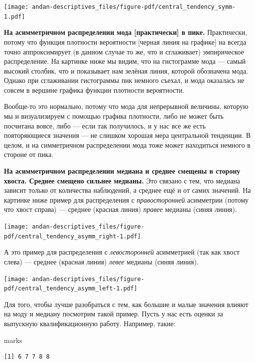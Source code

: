 \documentclass[
  letterpaper,
  DIV=11,
  numbers=noendperiod]{scrreprt}
\newenvironment{Shaded}{}{}
\newcommand{\NormalTok}[1]{\textcolor[rgb]{0.14,0.16,0.18}{#1}}
\theoremstyle{definition}
\theoremstyle{remark}
\begin{document}
\texttt{[image: andan-descriptives\_files/figure-pdf/central\_tendency\_symm-1.pdf]}

\textbf{На асимметричном распределении мода {[}практически{]} в пике.}
Практически, потому что функция плотности вероятности {[}черная линия на
графике{]} на всегда точно аппроксимирует (в данном случае то же, что и
сглаживает) эмпирическое распределение. На картинке ниже мы видим, что
на гистограмме мода --- самый высокий столбик, что и показывает нам
зелёная линия, которой обозначена мода. Однако при сглаживании
гистограммы пик немного съехал, и мода оказалась не совсем в вершине
графика функции плотности вероятности.

Вообще-то это нормально, потому что мода для непрерывной величины,
которую мы и визуализируем с помощью графика плотности, либо не может
быть посчитана вовсе, либо --- если так получилось, и у нас все же есть
повторяющиеся значения --- не слишком хорошая мера центральной
тенденции. В целом, и на симметричном распределении мода тоже может
находиться немного в стороне от пика.

\textbf{На асимметричном распределении медиана и среднее смещены в
сторону хвоста. Среднее смещено сильнее медианы.} Это связано с тем, что
медиана зависит только от количества наблюдений, а среднее ещё и от
самих значений. На картинке ниже пример для распределения с
\emph{правосторонней} асимметрии (потому что хвост справа) --- среднее
(красная линия) \emph{правее} медианы (синяя линия).

\texttt{[image: andan-descriptives\_files/figure-pdf/central\_tendency\_asymm\_right-1.pdf]}

А это пример для распределения с \emph{левосторонней} асимметрией (так
как хвост слева) --- среднее (красная линия) \emph{левее} медианы (синяя
линия).

\texttt{[image: andan-descriptives\_files/figure-pdf/central\_tendency\_asymm\_left-1.pdf]}

Для того, чтобы лучше разобраться с тем, как большие и малые значения
влияют на моду и медиану посмотрим такой пример. Пусть у нас есть оценки
за выпускную квалификационную работу. Например, такие:

\begin{Shaded}
\begin{Highlighting}[]
\NormalTok{marks}
\end{Highlighting}
\end{Shaded}

\begin{verbatim}
[1] 6 7 7 8 8
\end{verbatim}
\end{document}

